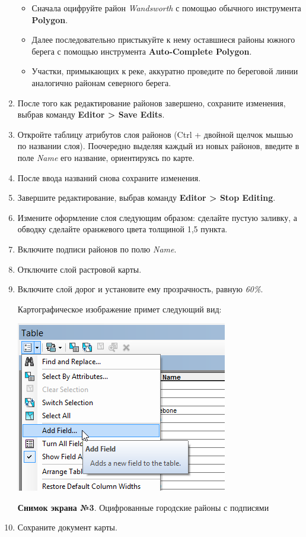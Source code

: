 \documentclass[]{book}
\theoremstyle{definition}
\theoremstyle{definition}
\theoremstyle{definition}
\theoremstyle{remark}
\begin{document}
\begin{enumerate}
  \begin{itemize}
  \item
    Сначала оцифруйте район \emph{Wandsworth} с помощью обычного
    инструмента \textbf{Polygon}.
  \item
    Далее последовательно пристыкуйте к нему оставшиеся районы южного
    берега с помощью инструмента \textbf{Auto-Complete Polygon}.
  \item
    Участки, примыкающих к реке, аккуратно проведите по береговой линии
    аналогично районам северного берега.
  \end{itemize}
\item
  После того как редактирование районов завершено, сохраните изменения,
  выбрав команду \textbf{Editor \textgreater{} Save Edits}.
\item
  Откройте таблицу атрибутов слоя районов (Ctrl + двойной щелчок мышью
  по названии слоя). Поочередно выделяя каждый из новых районов, введите
  в поле \emph{Name} его название, ориентируясь по карте.
\item
  После ввода названий снова сохраните изменения.
\item
  Завершите редактирование, выбрав команду \textbf{Editor \textgreater{}
  Stop Editing}.
\item
  Измените оформление слоя следующим образом: сделайте пустую заливку, а
  обводку сделайте оранжевого цвета толщиной 1,5 пункта.
\item
  Включите подписи районов по полю \emph{Name}.
\item
  Отключите слой растровой карты.
\item
  Включите слой дорог и установите ему прозрачность, равную \emph{60\%}.

  Картографическое изображение примет следующий вид:

  \includegraphics{images/Ex07/image14.png}

  \textbf{Снимок экрана №3}. Оцифрованные городские районы с подписями
\item
  Сохраните документ карты.
\end{enumerate}
\end{document}
